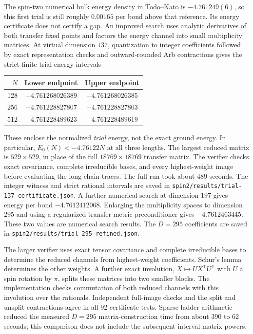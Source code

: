 \documentclass[11pt]{article}
\begin{document}
The spin-two numerical bulk energy density in Todo--Kato is
$-4.761249(6)$, so this first trial is still roughly $0.00165$ per bond above
that reference. Its energy certificate does not certify a gap.
An improved search uses analytic derivatives of both transfer fixed points
and factors the energy channel into small multiplicity matrices. At virtual
dimension $137$, quantization to integer coefficients followed by exact
representation checks and outward-rounded Arb contractions gives the strict
finite trial-energy intervals
\begin{center}
\begin{tabular}{rcc}
\toprule
$N$ & Lower endpoint & Upper endpoint\\
\midrule
128 & $-4.761268026389$ & $-4.761268026385$\\
256 & $-4.761228827807$ & $-4.761228827803$\\
512 & $-4.761228489623$ & $-4.761228489619$\\
\bottomrule
\end{tabular}
\end{center}
These enclose the normalized \emph{trial} energy, not the exact ground energy.
In particular, $E_0(N)<-4.76122N$ at all three lengths. The largest reduced
matrix is $529\times529$, in place of the full $18769\times18769$ transfer
matrix. The verifier checks exact covariance, complete irreducible bases,
and every highest-weight image before evaluating the long-chain traces.
The full run took about 489 seconds. The integer witness and strict rational
intervals are saved in \texttt{spin2/results/trial-137-certificate.json}.
A further numerical search at dimension $197$ gives energy per bond
$-4.7612412068$. Enlarging the multiplicity spaces to dimension $295$
and using a regularized transfer-metric preconditioner gives
$-4.7612463445$. These two values are numerical search results.
The $D=295$ coefficients are saved in
\texttt{spin2/results/trial-295-refined.json}.

The larger verifier uses exact tensor covariance and complete irreducible
bases to determine the reduced channels from highest-weight coefficients.
Schur's lemma determines the other weights. A further exact involution,
$X\mapsto UX^{\mathsf T}U^{\mathsf T}$ with $U$ a spin rotation by $\pi$,
splits these matrices into two smaller blocks. The implementation checks
commutation of both reduced channels with this involution over the rationals.
Independent full-image checks and the split and unsplit contractions agree
in all 92 certificate tests. Sparse ladder arithmetic reduced the measured
$D=295$ matrix-construction time from about 390 to 62 seconds; this comparison
does not include the subsequent interval matrix powers.
\end{document}
